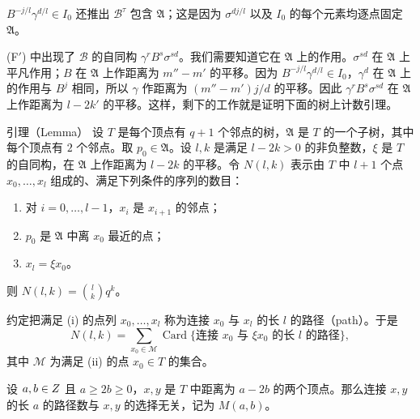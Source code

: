 $B^{-j/l}\gamma^{d/l}\in I_0$ 还推出 $\mathcal B^\tau$ 包含 $\mathfrak A$；这是因为 $\sigma^{dj/l}$ 以及 $I_0$ 的每个元素均逐点固定 $\mathfrak A$。

(F$'$) 中出现了 $\mathcal B$ 的自同构 $\gamma^rB^s\sigma^{sd}$。我们需要知道它在 $\mathfrak A$ 上的作用。$\sigma^{sd}$ 在 $\mathfrak A$ 上平凡作用；$B$ 在 $\mathfrak A$ 上作距离为 $m''-m'$ 的平移。因为 $B^{-j/l}\gamma^{d/l}\in I_0$，$\gamma^d$ 在 $\mathfrak A$ 上的作用与 $B^j$ 相同，所以 $\gamma$ 作距离为 $(m''-m')j/d$ 的平移。因此 $\gamma^rB^s\sigma^{sd}$ 在 $\mathfrak A$ 上作距离为 $l-2k'$ 的平移。这样，剩下的工作就是证明下面的树上计数引理。

\begin{originaltheorem}{引理（Lemma）}
设 $T$ 是每个顶点有 $q+1$ 个邻点的树，$\mathfrak A$ 是 $T$ 的一个子树，其中每个顶点有 $2$ 个邻点。取 $p_0\in\mathfrak A$。设 $l,k$ 是满足 $l-2k>0$ 的非负整数，$\xi$ 是 $T$ 的自同构，在 $\mathfrak A$ 上作距离为 $l-2k$ 的平移。令 $N(l,k)$ 表示由 $T$ 中 $l+1$ 个点 $x_0,\ldots,x_l$ 组成的、满足下列条件的序列的数目：
\begin{enumerate}
\item[(i)] 对 $i=0,\ldots,l-1$，$x_i$ 是 $x_{i+1}$ 的邻点；
\item[(ii)] $p_0$ 是 $\mathfrak A$ 中离 $x_0$ 最近的点；
\item[(iii)] $x_l=\xi x_0$。
\end{enumerate}
则 $N(l,k)=\binom lkq^k$。
\end{originaltheorem}

约定把满足 (i) 的点列 $x_0,\ldots,x_l$ 称为连接 $x_0$ 与 $x_l$ 的长 $l$ 的路径（path）。于是
\[
N(l,k)=\sum_{x_0\in\mathcal M}\operatorname{Card}\{\text{连接 }x_0\text{ 与 }\xi x_0\text{ 的长 }l\text{ 的路径}\},
\]
其中 $\mathcal M$ 为满足 (ii) 的点 $x_0\in T$ 的集合。

设 $a,b\in Z$ 且 $a\ge2b\ge0$，$x,y$ 是 $T$ 中距离为 $a-2b$ 的两个顶点。那么连接 $x,y$ 的长 $a$ 的路径数与 $x,y$ 的选择无关，记为 $M(a,b)$。


